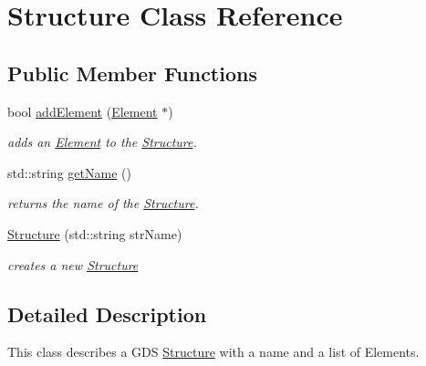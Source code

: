 \hypertarget{class_a_g_d_s_1_1_structure}{\section{Structure Class Reference}
\label{class_a_g_d_s_1_1_structure}
}
\subsection*{Public Member Functions}
\begin{DoxyCompactItemize}
\item 
bool \hyperlink{class_a_g_d_s_1_1_structure_a2dd203e6770f7d15d6f706867c919a60}{add\-Element} (\hyperlink{class_a_g_d_s_1_1_element}{Element} $\ast$)
\begin{DoxyCompactList}\small\item\em adds an \hyperlink{class_a_g_d_s_1_1_element}{Element} to the \hyperlink{class_a_g_d_s_1_1_structure}{Structure}. \end{DoxyCompactList}\item 
\hypertarget{class_a_g_d_s_1_1_structure_ac0fc966d4386ddb71d99361e3fccb311}{std\-::string \hyperlink{class_a_g_d_s_1_1_structure_ac0fc966d4386ddb71d99361e3fccb311}{get\-Name} ()}\label{class_a_g_d_s_1_1_structure_ac0fc966d4386ddb71d99361e3fccb311}

\begin{DoxyCompactList}\small\item\em returns the name of the \hyperlink{class_a_g_d_s_1_1_structure}{Structure}. \end{DoxyCompactList}\item 
\hyperlink{class_a_g_d_s_1_1_structure_a797bfd2e6684bb9870c8070b4ef6ff41}{Structure} (std\-::string str\-Name)
\begin{DoxyCompactList}\small\item\em creates a new \hyperlink{class_a_g_d_s_1_1_structure}{Structure} \end{DoxyCompactList}\end{DoxyCompactItemize}


\subsection{Detailed Description}
This class describes a G\-D\-S \hyperlink{class_a_g_d_s_1_1_structure}{Structure} with a name and a list of Elements. 

